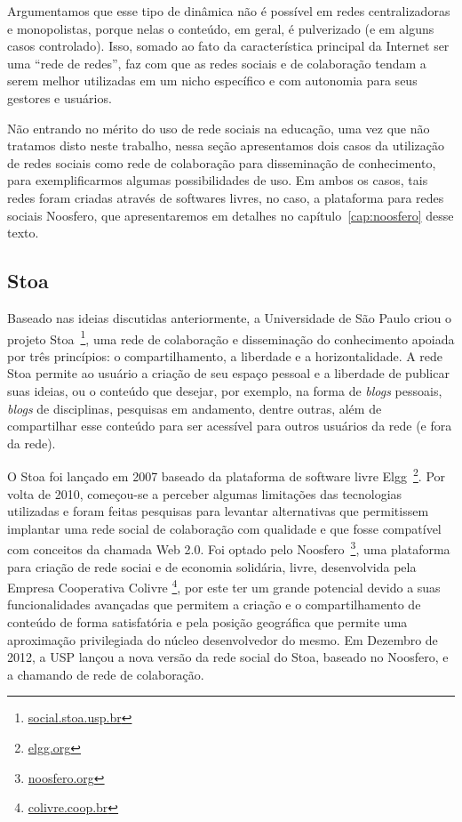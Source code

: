 Argumentamos que esse tipo de dinâmica não é possível em redes centralizadoras e monopolistas,
porque nelas o conteúdo, em geral, é pulverizado (e em alguns casos controlado).
Isso, somado ao fato da característica principal da Internet ser uma ``rede de redes'',
faz com que as redes sociais e de colaboração tendam a serem melhor utilizadas
em um nicho específico e com autonomia para seus gestores e usuários.

Não entrando no mérito do uso de rede sociais na educação, uma vez que não tratamos disto neste trabalho,
nessa seção apresentamos dois casos da utilização de redes sociais como rede de
colaboração para disseminação de conhecimento, para exemplificarmos algumas possibilidades de uso.
%
Em ambos os casos, tais redes foram criadas através de softwares livres, no caso, a  plataforma para 
redes sociais Noosfero, que apresentaremos em detalhes no capítulo~\ref{cap:noosfero} desse texto.

\subsection{Stoa}

Baseado nas ideias discutidas anteriormente, a Universidade de São Paulo criou o
projeto Stoa~\footnote{\url{social.stoa.usp.br}}, uma rede de colaboração e
disseminação do conhecimento apoiada por três princípios: o compartilhamento, a
liberdade e a horizontalidade.
%
A rede Stoa permite ao usuário a criação de seu espaço pessoal e a liberdade de
publicar suas ideias, ou o conteúdo que desejar, por exemplo, na forma de
\textit{blogs} pessoais, \textit{blogs} de disciplinas, pesquisas em andamento,
dentre outras, além de compartilhar esse conteúdo para ser acessível
para outros usuários da rede (e fora da rede).

O Stoa foi lançado em 2007 baseado da plataforma de software livre
Elgg~\footnote{\url{elgg.org}}.
%
Por volta de 2010, começou-se a perceber algumas limitações das tecnologias
utilizadas e foram feitas pesquisas para levantar alternativas que permitissem
implantar uma rede social de colaboração com qualidade e que fosse compatível
com conceitos da chamada Web 2.0.
%
Foi optado pelo Noosfero~\footnote{\url{noosfero.org}}, uma plataforma para
criação de rede sociai e de economia solidária, livre, desenvolvida pela
Empresa Cooperativa Colivre \footnote{\url{colivre.coop.br}}, por este ter um
grande potencial devido a suas funcionalidades avançadas que permitem a criação
e o compartilhamento de conteúdo de forma satisfatória e pela posição geográfica
que permite uma aproximação privilegiada do núcleo desenvolvedor do mesmo.
%
Em Dezembro de 2012, a USP lançou a nova versão da rede social do Stoa, baseado
no Noosfero, e a chamando de rede de colaboração.

